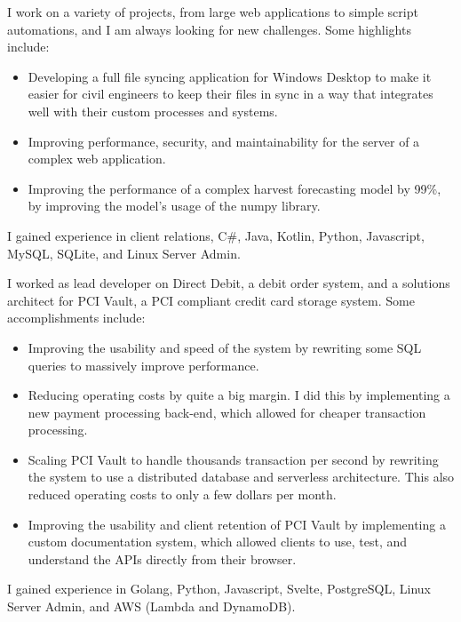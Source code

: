 \documentclass[a4paper]{twentysecondcv} %
\begin{document}
\begin{twenty} %
    {I work on a variety of projects, from large web applications to simple script automations, and I am always looking for new challenges. Some highlights include:
    \begin{itemize}
        \item Developing a full file syncing application for Windows Desktop to make it easier for civil engineers to keep their files in sync in a way that integrates well with their custom processes and systems.
        \item Improving performance, security, and maintainability for the server of a complex web application.
        \item Improving the performance of a complex harvest forecasting model by 99\%, by improving the model's usage of the numpy library.
    \end{itemize}
    I gained experience in client relations, C\#, Java, Kotlin, Python, Javascript, MySQL, SQLite, and Linux Server Admin.}
        {I worked as lead developer on Direct Debit, a debit order system, and a solutions architect for PCI Vault, a PCI compliant credit card storage system.
        Some accomplishments include:
        \begin{itemize}
            \item Improving the usability and speed of the system by rewriting some SQL queries to massively improve performance.
            \item Reducing operating costs by quite a big margin. I did this by implementing a new payment processing back-end, which allowed for cheaper transaction processing.
            \item Scaling PCI Vault to handle thousands transaction per second by rewriting the system to use a distributed database and serverless architecture. This also reduced operating costs to only a few dollars per month.
            \item Improving the usability and client retention of PCI Vault by implementing a custom documentation system, which allowed clients to use, test, and understand the APIs directly from their browser.
        \end{itemize}
        I gained experience in Golang, Python, Javascript, Svelte, PostgreSQL, Linux Server Admin, and AWS (Lambda and DynamoDB).}

\end{twenty}
\end{document}
